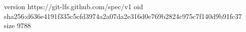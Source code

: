 version https://git-lfs.github.com/spec/v1
oid sha256:d636e4191f335c5cfd3974a2a07da2e316d0e769b2824c975c7f140d9b91fc37
size 9788
